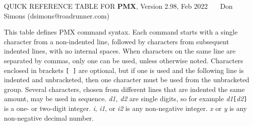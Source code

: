 \documentclass[12pt]{article}
\begin{document}
{\footnotesize\small

\def\bs{{\tt\char'134}}
\def\bsn{\bs}
\def\dhline{\hline\hline}
\def\newcol{
\hline
\end{tabular}

\begintab
\hline
}

\centerline{QUICK REFERENCE TABLE FOR {\bf PMX}, 
Version 2.98,
Feb 2022~~~
\hfill Don Simons (dsimons@roadrunner.com)}

\null

 This table defines PMX command syntax. Each command starts with a 
single character from a non-indented line, followed by characters from 
subsequent indented lines, with no internal spaces. When characters 
on the same line are separated by commas, only one can be used, unless 
otherwise noted. Characters enclosed in brackets {\tt [~]} are optional, 
but if one is used and the following line is indented and unbracketed, 
then one character must be used from the unbracketed group. Several 
characters, chosen from different lines that are indented the same 
amount, may be used in sequence. {\it d1, d2} are single digits, so 
for example {\it d1}{\tt[}{\it d2}{\tt]} is a one- or two-digit integer.
{\it i}, {\it i1}, or {\it i2} is any non-negative integer.  
{\it x} or {\it y} is any non-negative decimal number.


}
\end{document}

